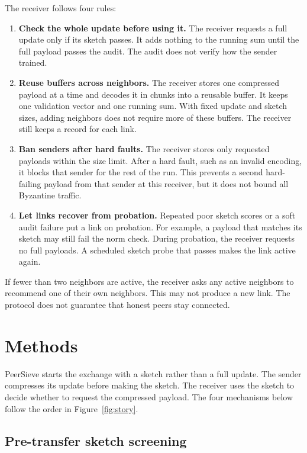 \documentclass{article}
\begin{document}
\begin{samepage}
The receiver follows four rules:
\begin{enumerate}
  \item \textbf{Check the whole update before using it.} The receiver requests a full update only if its sketch passes. It adds nothing to the running sum until the full payload passes the audit. The audit does not verify how the sender trained.
  \item \textbf{Reuse buffers across neighbors.} The receiver stores one compressed payload at a time and decodes it in chunks into a reusable buffer. It keeps one validation vector and one running sum. With fixed update and sketch sizes, adding neighbors does not require more of these buffers. The receiver still keeps a record for each link.
  \item \textbf{Ban senders after hard faults.} The receiver stores only requested payloads within the size limit. After a hard fault, such as an invalid encoding, it blocks that sender for the rest of the run. This prevents a second hard-failing payload from that sender at this receiver, but it does not bound all Byzantine traffic.
  \item \textbf{Let links recover from probation.} Repeated poor sketch scores or a soft audit failure put a link on probation. For example, a payload that matches its sketch may still fail the norm check. During probation, the receiver requests no full payloads. A scheduled sketch probe that passes makes the link active again.
\end{enumerate}
\end{samepage}

If fewer than two neighbors are active, the receiver asks any active neighbors to recommend one of their own neighbors. This may not produce a new link. The protocol does not guarantee that honest peers stay connected.

\section{Methods}
\label{sec:design}

PeerSieve starts the exchange with a sketch rather than a full update. The sender compresses its update before making the sketch. The receiver uses the sketch to decide whether to request the compressed payload. The four mechanisms below follow the order in Figure~\ref{fig:story}.

\subsection{Pre-transfer sketch screening}
\end{document}
